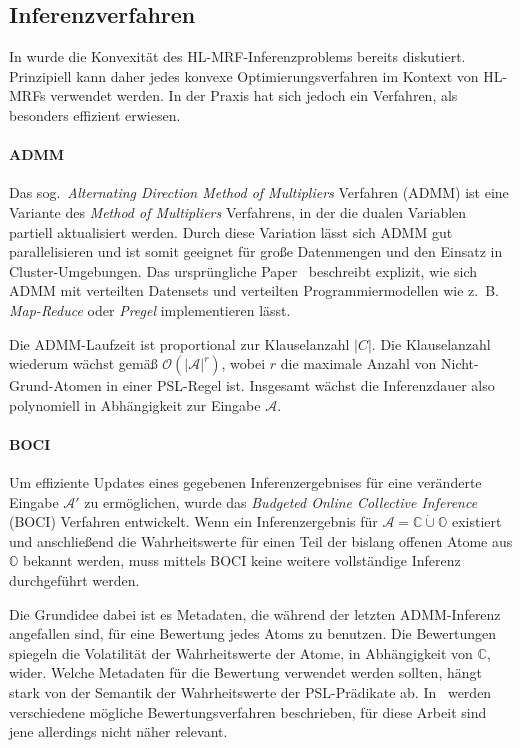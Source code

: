 \subsection{Inferenzverfahren}%
\label{sec:theory:psl:inference}

In  wurde die Konvexität des HL-MRF-Inferenzproblems bereits diskutiert.
Prinzipiell kann daher jedes konvexe Optimierungsverfahren im Kontext von HL-MRFs verwendet werden.
In der Praxis hat sich jedoch ein Verfahren, als besonders effizient erwiesen.

\paragraph{ADMM}
Das sog.\ \textit{Alternating Direction Method of Multipliers} Verfahren (ADMM) ist eine Variante des \textit{Method of Multipliers} Verfahrens, in der die dualen Variablen partiell aktualisiert werden.
Durch diese Variation lässt sich ADMM gut parallelisieren und ist somit geeignet für große Datenmengen und den Einsatz in Cluster-Umgebungen.
Das ursprüngliche Paper~\cite[Kapitel 10]{Boyd2011} beschreibt explizit, wie sich ADMM mit verteilten Datensets und verteilten Programmiermodellen wie z.~B. \textit{Map-Reduce} oder \textit{Pregel} implementieren lässt.

Die ADMM-Laufzeit ist proportional zur Klauselanzahl $|C|$.
Die Klauselanzahl wiederum wächst gemäß $\mathcal{O}(|\mathcal{A}|^r)$, wobei $r$ die maximale Anzahl von Nicht-Grund-Atomen in einer PSL-Regel ist.
Insgesamt wächst die Inferenzdauer also polynomiell in Abhängigkeit zur Eingabe $\mathcal{A}$.

\paragraph{BOCI}
Um effiziente Updates eines gegebenen Inferenzergebnises für eine veränderte Eingabe $\mathcal{A'}$ zu ermöglichen, wurde das \textit{Budgeted Online Collective Inference} (BOCI) Verfahren entwickelt.
Wenn ein Inferenzergebnis für $\mathcal{A} = \mathbb{C} \mathbin{\dot\cup} \mathbb{O}$ existiert und anschließend die Wahrheitswerte für einen Teil der bislang offenen Atome aus $\mathbb{O}$ bekannt werden, muss mittels BOCI keine weitere vollständige Inferenz durchgeführt werden.

Die Grundidee dabei ist es Metadaten, die während der letzten ADMM-Inferenz angefallen sind, für eine Bewertung jedes Atoms zu benutzen.
Die Bewertungen spiegeln die Volatilität der Wahrheitswerte der Atome, in Abhängigkeit von $\mathbb{C}$, wider.
Welche Metadaten für die Bewertung verwendet werden sollten, hängt stark von der Semantik der Wahrheitswerte der PSL-Prädikate ab.
In~\cite[Kapitel 4]{Pujara2015} werden verschiedene mögliche Bewertungsverfahren beschrieben, für diese Arbeit sind jene allerdings nicht näher relevant.


